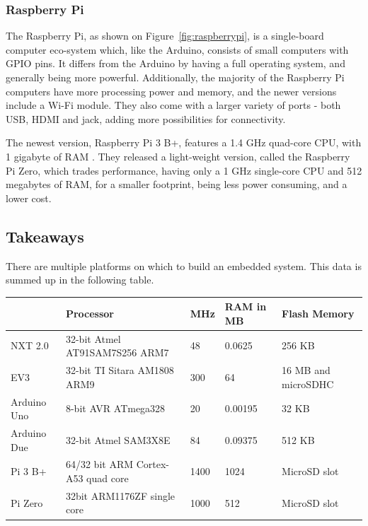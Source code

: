 \subsubsection{Raspberry Pi}\label{subsec:rpispecs}
The Raspberry Pi, as shown on Figure~\ref{fig:raspberrypi}, is a single-board computer eco-system which, like the Arduino, consists of small computers with GPIO pins.
It differs from the Arduino by having a full operating system, and generally being more powerful.
Additionally, the majority of the Raspberry Pi computers have more processing power and memory, and the newer versions include a Wi-Fi module.
They also come with a larger variety of ports - both USB, HDMI and jack, adding more possibilities for connectivity.

The newest version, Raspberry Pi 3 B+, features a 1.4 GHz quad-core CPU, with 1 gigabyte of RAM \cite{raspberrypi}.
They released a light-weight version, called the Raspberry Pi Zero, which trades performance, having only a 1 GHz single-core CPU and 512 megabytes of RAM, for a smaller footprint, being less power consuming, and a lower cost.

\subsection{Takeaways}
\label{platformtakeaways}
There are multiple platforms on which to build an embedded system.
This data is summed up in the following table.

\begin{table}[h]
	\begin{adjustbox}{max width=\textwidth}
	\begin{tabular}{|l|l|l|l|l|}
		\hline
		                & Processor                          & MHz 	& RAM in MB    & Flash Memory          	\\\hline
		NXT 2.0 		& 32-bit Atmel AT91SAM7S256 ARM7     & 48  	& 0.0625   & 256 KB                   	\\
		EV3     		& 32-bit TI Sitara AM1808 ARM9       & 300 	& 64   & 16 MB and microSDHC 			\\
		Arduino Uno    	& 8-bit AVR ATmega328                & 20  	& 0.00195    & 32 KB                    \\
		Arduino Due    	& 32-bit Atmel SAM3X8E               & 84  	& 0.09375   & 512 KB                   	\\
		Pi 3 B+      	& 64/32 bit ARM Cortex-A53 quad core & 1400 & 1024    & MicroSD slot            	\\
		Pi Zero       	& 32bit ARM1176ZF single core        & 1000 & 512  & MicroSD slot 					\\\hline
	\end{tabular}
\end{adjustbox}
\end{table}

